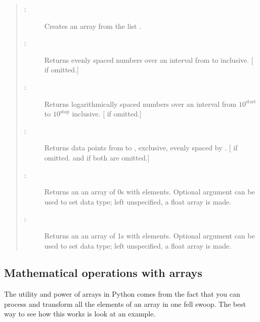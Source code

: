 \documentclass[letterpaper,10pt,english]{sphinxmanual}
\begin{document}
\begin{quote}
\begin{description}
\item[{:}] \leavevmode
Creates an array from the list .

\item[{:}] \leavevmode
Returns  evenly spaced numbers over an interval from  to  inclusive.  {[} if omitted.{]}

\item[{:}] \leavevmode
Returns  logarithmically spaced numbers over an interval from $10^{\mathrm{start}}$ to $10^{\mathrm{stop}}$ inclusive.  {[} if omitted.{]}

\item[{:}] \leavevmode
Returns data points from  to , exclusive, evenly spaced by .  {[} if omitted.   and  if both are omitted.{]}

\item[{:}] \leavevmode
Returns an an array of 0s with  elements.  Optional  argument can be used to set data type; left unspecified, a float array is made.

\item[{:}] \leavevmode
Returns an an array of 1s with  elements.  Optional  argument can be used to set data type; left unspecified, a float array is made.

\end{description}
\end{quote}


\subsection{Mathematical operations with arrays}
\label{chap3/chap3_arrays:mathematical-operations-with-arrays}
The utility and power of arrays in Python comes from the fact that you can process and transform all the elements of an array in one fell swoop.  The best way to see how this works is look at an example.
\end{document}
